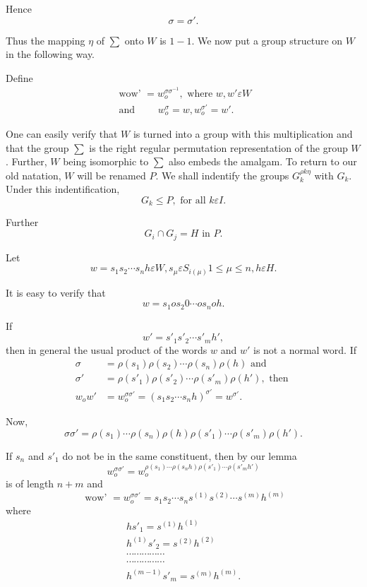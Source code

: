 Hence 
$$
\sigma = \sigma'.
$$

Thus the mapping $\eta$ of $\sum$ onto $W$ is $1-1$. We now put a
group structure on $W$ in the following way. 

Define
\begin{gather*}
  \text { wow' } = w_o ^{\sigma \sigma^{-1}}, \text{ where }w,w' \varepsilon W\\
  \text{ and } \qquad w_o ^{\sigma } = w, w_o ^{\sigma'} = w'.
\end{gather*}

One can easily verify that $W$ is turned into a group with this
multiplication and that the group $\sum$ is the right regular
permutation representation of the group $W$. Further, $W$ being
isomorphic to $\sum$ also embeds the amalgam. To return to our old
natation, $W$ will be renamed $P$. We shall indentify the groups
$G_k^{\rho k \eta}$ with $G_k$. Under this indentification,  
$$
G_k \leq P, \text{ for all } k \varepsilon I.
$$

Further 
$$
G_i \cap G_j = H \text{ in } P.
$$

Let
$$
w = s_1 s_2 \cdots s_n h \varepsilon W, s_{\mu } \varepsilon S_{i
  (\mu)} 1 \leq \mu \leq n, h \varepsilon H. 
$$

It is easy to verify that
$$
w = s_1 o s_2 0 \cdots o s_n o h.
$$

If
$$
w' = s'_1 s'_2 \cdots s'_m h',
$$
then in general the usual product of the words $w$ and $w'$ is not a
normal word. If 
\begin{align*}
  \sigma & = \rho(s_1) \rho(s_2) \cdots \rho(s_n) \rho(h) \text{ and }\\
  \sigma' & = \rho(s'_1)\rho(s'_2) \cdots \rho(s'_m) \rho(h'), \text{ then }\\
  w_o w' & = w_o^ {\sigma \sigma'} = (s_1 s_2 \cdots s_n h)^{\sigma'} = w^{\sigma'}.
\end{align*}

Now,
$$
\sigma \sigma' = \rho(s_1) \cdots \rho(s_n) \rho(h) \rho(s'_1) \cdots
\rho(s'_m) \rho(h'). 
$$

If $s_n$ and $s'_1$ do not be in the same constituent, then  by our lemma
$$
w_o ^{\sigma \sigma'}= w_o^{\rho(s_1) \cdots \rho(s_n h) \rho(s'_1) \cdots \rho(s'_m h')}
$$
is of length $n + m$ and 
$$
\text { wow' } = w_o ^{\sigma \sigma'} = s_1 s_2 \cdots s_n
s^{(1)}s^{(2)} \cdots s^{(m)}h^{(m)} 
$$
where
\begin{gather*}
  h s'_1 = s^{(1)} h^{(1)}\\
  h^{(1)} s'_2 = s^{(2)}h ^{(2)}\\
  \cdots \cdots \cdots \cdots \cdots\\
  \cdots \cdots \cdots \cdots \cdots \\
  h^{(m-1)}s'_m = s^{(m)} h^{(m)}.
\end{gather*}

